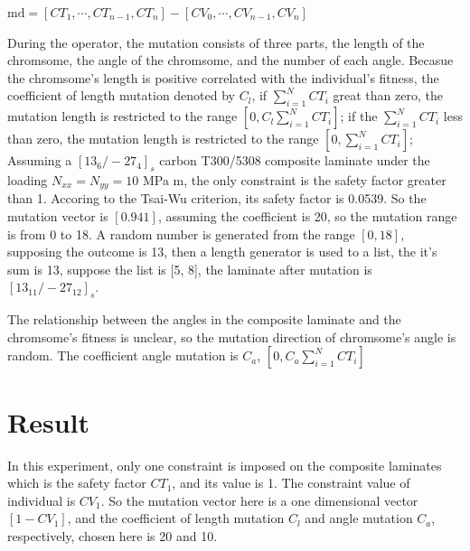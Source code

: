 \documentclass{article}
\begin{document}
$\text{md} = [CT_1, \cdots, CT_{n-1}, CT_n] -  [CV_0, \cdots, CV_{n-1}, CV_n]$

During the operator, the mutation consists of three parts, the length of the chromsome, the angle
of the chromsome, and the number of each angle. Becasue the chromsome's length is positive correlated with the individual's
fitness, the coefficient of length mutation denoted by $C_l$, if $\sum_{i=1}^{N}{CT_i}$ great than
zero, the mutation length is restricted to the range $[0,C_l \sum_{i=1}^{N}{CT_i}]$; if the
$\sum_{i=1}^{N}{CT_i}$ less than zero, the mutation length is restricted to the range
$[0,\sum_{i=1}^{N}{CT_i}]$; Assuming a $[13_6/-27_4]_s$ carbon T300/5308 composite laminate under
the loading $N_{xx} = N_{yy} = 10$ MPa m, the only constraint is the safety factor greater than 1.
Accoring to the Tsai-Wu criterion, its safety factor is 0.0539. So the mutation vector is $[0.941]$,
assuming the coefficient is 20, so the mutation range is from 0 to 18. A random number is generated
from the range $[0, 18]$, supposing the outcome is 13, then a length generator is used to a list,
the it's sum is 13, suppose the list is [5, 8], the laminate after mutation is $[13_{11}/-27_{12}]_s$.


The relationship between the angles in the composite laminate and the chromsome's fitness is
unclear, so the mutation direction of chromsome's angle is random. The coefficient angle mutation is
$C_a$, $[0,C_a \sum_{i=1}^{N}{CT_i}]$


\section{Result}
In this experiment, only one constraint is imposed on the composite laminates which is the safety
factor $CT_1$, and its value is 1. The constraint value of individual is $CV_1$. So the mutation
vector here is a one dimensional vector $[1 - CV_1 ]$, and the coefficient of length mutation $C_l$ and
angle mutation $C_a$, respectively, chosen here is 20 and 10. 
\end{document}
